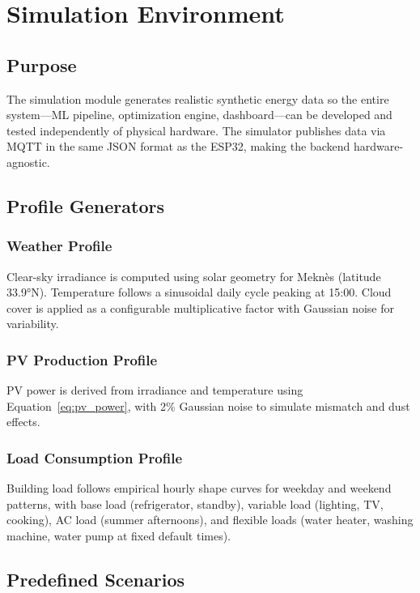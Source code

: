 \chapter{Simulation Environment}
\label{ch:simulation}

\section{Purpose}

The simulation module generates realistic synthetic energy data so the entire system---ML pipeline, optimization engine, dashboard---can be developed and tested independently of physical hardware. The simulator publishes data via MQTT in the same JSON format as the ESP32, making the backend hardware-agnostic.

\section{Profile Generators}

\subsection{Weather Profile}
Clear-sky irradiance is computed using solar geometry for Meknès (latitude 33.9°N). Temperature follows a sinusoidal daily cycle peaking at 15:00. Cloud cover is applied as a configurable multiplicative factor with Gaussian noise for variability.

\subsection{PV Production Profile}
PV power is derived from irradiance and temperature using Equation~\ref{eq:pv_power}, with 2\% Gaussian noise to simulate mismatch and dust effects.

\subsection{Load Consumption Profile}
Building load follows empirical hourly shape curves for weekday and weekend patterns, with base load (refrigerator, standby), variable load (lighting, TV, cooking), AC load (summer afternoons), and flexible loads (water heater, washing machine, water pump at fixed default times).

\section{Predefined Scenarios}

